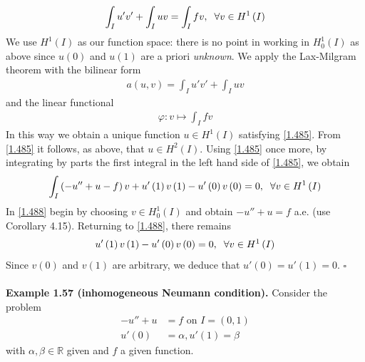 \documentclass[a4paper,oneside]{article}
\numberwithin{equation}{section}
\begin{document}
\begin{align}
\label{1.485}
\int_I {u'v'}  + \int_I {uv}  = \int_I {fv} ,\hspace{0.2cm} \forall v \in {H^1}\left( I \right)
\end{align}
We use $H^1\left(I\right)$ as our function space: there is no point in working in $H_0^1\left(I\right)$ as above since $u\left(0\right)$ and $u\left(1\right)$ are a priori \textit{unknown}. We apply the Lax-Milgram theorem with the bilinear form 
\begin{align}
a\left( {u,v} \right) = \int_I {u'v'}  + \int_I {uv} 
\end{align}
and the linear functional 
\begin{align}
\varphi :v \mapsto \int_I {fv} 
\end{align}
In this way we obtain a unique function $u\in H^1\left(I\right)$ satisfying \eqref{1.485}. From \eqref{1.485} it follows, as above, that $u\in H^2\left(I\right)$. Using \eqref{1.485} once more, by integrating by parts the first integral in the left hand side of \eqref{1.485}, we obtain
\begin{align}
\label{1.488}
\int_I {\left( { - u'' + u - f} \right)v}  + u'\left( 1 \right)v\left( 1 \right) - u'\left( 0 \right)v\left( 0 \right) = 0,\hspace{0.2cm}\forall v \in {H^1}\left( I \right)
\end{align}
In \eqref{1.488} begin by choosing $v\in H_0^1\left(I\right)$ and obtain $-u''+u=f$ a.e. (use Corollary 4.15). Returning to \eqref{1.488}, there remains
\begin{align}
u'\left( 1 \right)v\left( 1 \right) - u'\left( 0 \right)v\left( 0 \right) = 0,\hspace{0.2cm} \forall v \in {H^1}\left( I \right)
\end{align}
Since $v\left(0\right)$ and $v\left(1\right)$ are arbitrary, we deduce that $u'\left(0\right)=u'\left(1\right)=0$. \hfill $\square$\\
\\
\textbf{Example 1.57 (inhomogeneous Neumann condition).} Consider the problem
\begin{align}
\label{1.490}
 - u'' + u &= f\mbox{ on } I = \left( {0,1} \right)\\
u'\left( 0 \right) &= \alpha ,u'\left( 1 \right) = \beta  \label{1.491}
\end{align}
with $\alpha,\beta \in \mathbb{R}$ given and $f$ a given function.\\
\\
\end{document}

